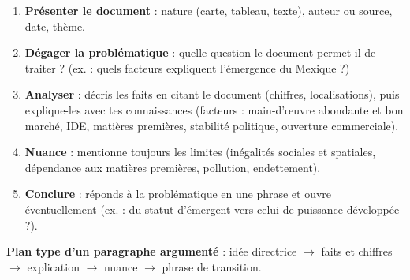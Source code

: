 \documentclass[11pt]{article}
\begin{document}
\begin{methode}
\begin{enumerate}
\item \textbf{Présenter le document} : nature (carte, tableau, texte), auteur ou source, date, thème.
\item \textbf{Dégager la problématique} : quelle question le document permet-il de traiter ? (ex. : quels facteurs expliquent l'émergence du Mexique ?)
\item \textbf{Analyser} : décris les faits en citant le document (chiffres, localisations), puis explique-les avec tes connaissances (facteurs : main-d'œuvre abondante et bon marché, IDE, matières premières, stabilité politique, ouverture commerciale).
\item \textbf{Nuance} : mentionne toujours les limites (inégalités sociales et spatiales, dépendance aux matières premières, pollution, endettement).
\item \textbf{Conclure} : réponds à la problématique en une phrase et ouvre éventuellement (ex. : du statut d'émergent vers celui de puissance développée ?).
\end{enumerate}
\textbf{Plan type d'un paragraphe argumenté} : idée directrice $\rightarrow$ faits et chiffres $\rightarrow$ explication $\rightarrow$ nuance $\rightarrow$ phrase de transition.
\end{methode}
\end{document}
